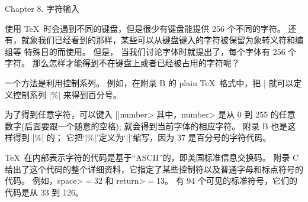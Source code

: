 


\beginchapter Chapter 8. 字符输入


\1使用 \TeX\ 时会遇到不同的键盘，但是很少有键盘能提供 256 个不同的字符。%
还有，就象我们已经看到的那样，某些{可以}从键盘键入的字符被保留为象转义符和编组等%
特殊目的而使用。%
但\hbox{是，} 当我们讨论字体时就提出了，每个字体有 256 个字符。%
那么怎样才能得到不在键盘上或者已经被占用的字符呢？

一个方法是利用控制系列。%
例如，在附录 B 的 plain \TeX\ 格式中，把 |%
就可以定义控制系列 |\%| 来得到百分号。

为了得到任意字符，可以键入
\begindisplay
|\char|\<number>
\enddisplay
其中，\<number> 是从 0 到 255 的任意数字(后面要跟一个随意的空格);
就会得到当前字体的相应字符。%
附录 B 也是这样得到 |\%| 的；
它把`|\%|'定义为`||'缩写，因为 37 是百分号的字符\hbox{代码。}

\TeX\ 在内部表示字符的代码是基于``ASCII''的，即美国标准信息交换码。%
附录 C 给出了这个代码的整个详细资料，它指定了某些控制符以及普通字母和标点符号的代码。%
例如，\<space>${}=32$ 和 \<return>${}=13$。%
有 94 个可见的标准符号，它们的代码是从 33 到 126。

